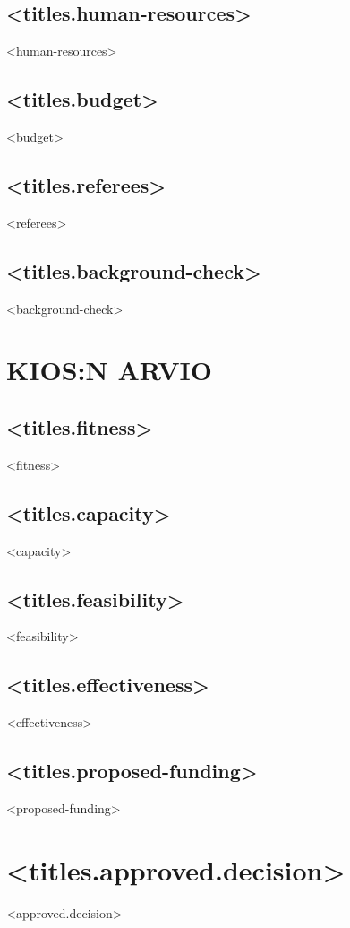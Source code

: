 \documentclass[twoside,a4paper]{article}
\begin{document}
		\subsection*{<titles.human-resources>}
		    <human-resources>
		
		\subsection*{<titles.budget>}
		    <budget>
		
		\subsection*{<titles.referees>}
		    <referees>
		
		\subsection*{<titles.background-check>}
		    <background-check>
		
		\newpage	
		\section{KIOS:N ARVIO}
		\subsection*{<titles.fitness>}
		    <fitness>
		
		\subsection*{<titles.capacity>}
		    <capacity>
		
		\subsection*{<titles.feasibility>}		
		    <feasibility>
		
		\subsection*{<titles.effectiveness>}	
		    <effectiveness>
		
		\subsection*{<titles.proposed-funding>}
		    <proposed-funding>
		
		\newpage
	\section{<titles.approved.decision>}		
		<approved.decision>
	
\end{document}
